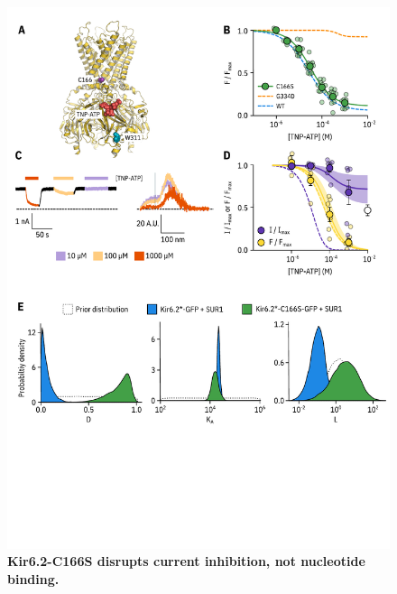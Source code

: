 \documentclass[10pt,lineno, doublespacing]{elife}
\begin{document}
\begin{figure}
\begin{fullwidth}
\centering
\includegraphics[height=0.9\textheight]{figure_three}
\caption{\textbf{Kir6.2-C166S disrupts current inhibition, not nucleotide binding.}}
\label{fig:three}
\end{fullwidth}
\end{figure}
\end{document}
